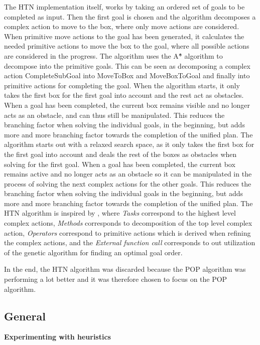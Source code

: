 \documentclass[Main]{subfiles}
\begin{document}
The HTN implementation itself, works by taking an ordered set of goals to be completed as input. Then the first goal is chosen and the algorithm decomposes a complex action to move to the box, where only move actions are considered. When primitive move actions to the goal has been generated, it calculates the needed primitive actions to move the box to the goal, where all possible actions are considered in the progress. The algorithm uses the A\^{*} algorithm to decompose into the primitive goals.
This can be seen as decomposing a complex action CompleteSubGoal into MoveToBox and MoveBoxToGoal and finally into primitive actions for completing the goal.
When the algorithm starts, it only takes the first box for the first goal into account and the rest act as obstacles. When a goal has been completed, the current box remains visible and no longer acts as an obstacle, and can thus still be manipulated. This reduces the branching factor when solving the individual goals, in the beginning, but adds more and more branching factor towards the completion of the unified plan.
The algorithm starts out with a relaxed search space, as it only takes the first box for the first goal into account and deals the rest of the boxes as obstacles when solving for the first goal.
When a goal has been completed, the current box remains active and no longer acts as an obstacle so it can be manipulated in the process of solving the next complex actions for the other goals.
This reduces the branching factor when solving the individual goals in the beginning, but adds more and more branching factor towards the completion of the unified plan.
The HTN algorithm is inspired by \cite{nau2003shop2}, where \textit{Tasks} correspond to the highest level complex actions, \textit{Methods} corresponds to decomposition of the top level complex action, \textit{Operators} correspond to primitive actions which is derived when refining the complex actions, and the \textit{External function call} corresponds to out utilization of the genetic algorithm for finding an optimal goal order.

In the end, the HTN algorithm was discarded because the POP algorithm was performing a lot better and it was therefore chosen to focus on the POP algorithm.


\subsection{General}


\textbf{Experimenting with heuristics}
\end{document}

